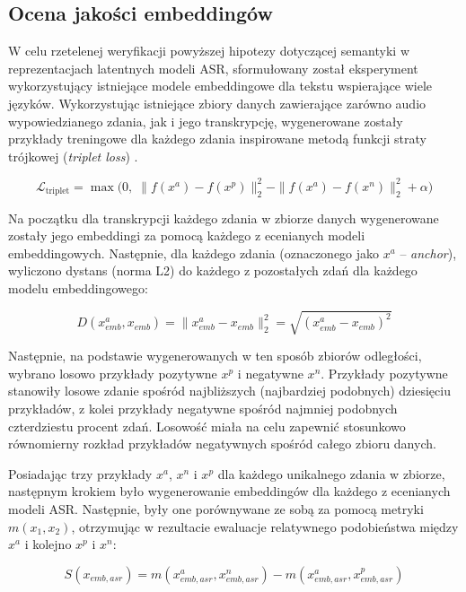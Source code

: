 \subsection{Ocena jakości embeddingów}
W celu rzetelenej weryfikacji powyższej hipotezy dotyczącej semantyki w reprezentacjach latentnych modeli ASR, sformułowany został eksperyment wykorzystujący istniejące modele embeddingowe dla tekstu wspierające wiele języków. Wykorzystując istniejące zbiory danych zawierające zarówno audio wypowiedzianego zdania, jak i jego transkrypcję, wygenerowane zostały przykłady treningowe dla każdego zdania inspirowane metodą funkcji straty trójkowej (\textit{triplet loss}) \cite{tripletLoss}.

\begin{equation}
    \mathcal{L}_{\text{triplet}} = \max \Big( 0, \; \| f(x^a) - f(x^p) \|_2^2 - \| f(x^a) - f(x^n) \|_2^2 + \alpha \Big)
    \label{eq:tripletloss}
\end{equation}

Na początku dla transkrypcji każdego zdania w zbiorze danych wygenerowane zostały jego embeddingi za pomocą każdego z ecenianych modeli embeddingowych. Następnie, dla każdego zdania (oznaczonego jako $x^a$ -- \textit{anchor}), wyliczono dystans (norma L2) do każdego z pozostałych zdań dla każdego modelu embeddingowego:

\begin{equation}
    D(x_{emb}^a, x_{emb}) = \| x_{emb}^a - x_{emb} \|_2^2 = \sqrt{(x_{emb}^a - x_{emb})^2}
\end{equation}

Następnie, na podstawie wygenerowanych w ten sposób zbiorów odległości, wybrano losowo przykłady pozytywne $x^p$ i negatywne $x^n$. Przykłady pozytywne stanowiły losowe zdanie spośród najbliższych (najbardziej podobnych) dziesięciu przykładów, z kolei przykłady negatywne spośród najmniej podobnych czterdziestu procent zdań. Losowość miała na celu zapewnić stosunkowo równomierny rozkład przykładów negatywnych spośród całego zbioru danych.

Posiadając trzy przykłady $x^a$, $x^n$ i $x^p$ dla każdego unikalnego zdania w zbiorze, następnym krokiem było wygenerowanie embeddingów dla każdego z ecenianych modeli ASR. Następnie, były one porównywane ze sobą za pomocą metryki $m(x_1, x_2)$, otrzymując w rezultacie ewaluacje relatywnego podobieństwa między $x^a$ i kolejno $x^p$ i $x^n$:

\begin{equation}
    S(x_{emb, asr}) = m(x_{emb, asr}^a, x_{emb, asr}^n) - m(x_{emb, asr}^a, x_{emb, asr}^p)
    \label{eq:tripletDiff}
\end{equation}

